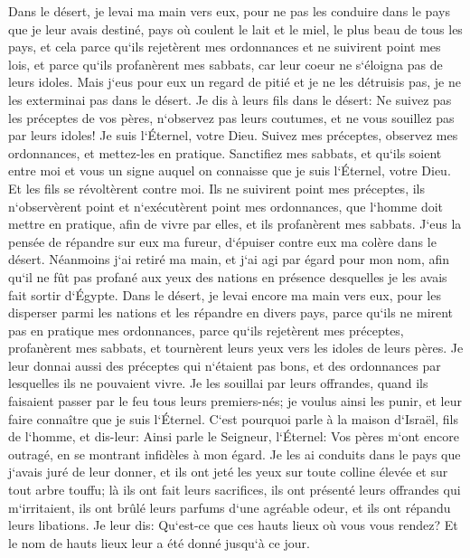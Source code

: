 \verse Dans le désert, je levai ma main vers eux, pour ne pas les conduire dans le pays que je leur avais destiné, pays où coulent le lait et le miel, le plus beau de tous les pays, 
\verse et cela parce qu`ils rejetèrent mes ordonnances et ne suivirent point mes lois, et parce qu`ils profanèrent mes sabbats, car leur coeur ne s`éloigna pas de leurs idoles. 
\verse Mais j`eus pour eux un regard de pitié et je ne les détruisis pas, je ne les exterminai pas dans le désert. 
\verse Je dis à leurs fils dans le désert: Ne suivez pas les préceptes de vos pères, n`observez pas leurs coutumes, et ne vous souillez pas par leurs idoles! 
\verse Je suis l`Éternel, votre Dieu. Suivez mes préceptes, observez mes ordonnances, et mettez-les en pratique. 
\verse Sanctifiez mes sabbats, et qu`ils soient entre moi et vous un signe auquel on connaisse que je suis l`Éternel, votre Dieu. 
\verse Et les fils se révoltèrent contre moi. Ils ne suivirent point mes préceptes, ils n`observèrent point et n`exécutèrent point mes ordonnances, que l`homme doit mettre en pratique, afin de vivre par elles, et ils profanèrent mes sabbats. J`eus la pensée de répandre sur eux ma fureur, d`épuiser contre eux ma colère dans le désert. 
\verse Néanmoins j`ai retiré ma main, et j`ai agi par égard pour mon nom, afin qu`il ne fût pas profané aux yeux des nations en présence desquelles je les avais fait sortir d`Égypte. 
\verse Dans le désert, je levai encore ma main vers eux, pour les disperser parmi les nations et les répandre en divers pays, 
\verse parce qu`ils ne mirent pas en pratique mes ordonnances, parce qu`ils rejetèrent mes préceptes, profanèrent mes sabbats, et tournèrent leurs yeux vers les idoles de leurs pères. 
\verse Je leur donnai aussi des préceptes qui n`étaient pas bons, et des ordonnances par lesquelles ils ne pouvaient vivre. 
\verse Je les souillai par leurs offrandes, quand ils faisaient passer par le feu tous leurs premiers-nés; je voulus ainsi les punir, et leur faire connaître que je suis l`Éternel. 
\verse C`est pourquoi parle à la maison d`Israël, fils de l`homme, et dis-leur: Ainsi parle le Seigneur, l`Éternel: Vos pères m`ont encore outragé, en se montrant infidèles à mon égard. 
\verse Je les ai conduits dans le pays que j`avais juré de leur donner, et ils ont jeté les yeux sur toute colline élevée et sur tout arbre touffu; là ils ont fait leurs sacrifices, ils ont présenté leurs offrandes qui m`irritaient, ils ont brûlé leurs parfums d`une agréable odeur, et ils ont répandu leurs libations. 
\verse Je leur dis: Qu`est-ce que ces hauts lieux où vous vous rendez? Et le nom de hauts lieux leur a été donné jusqu`à ce jour. 
